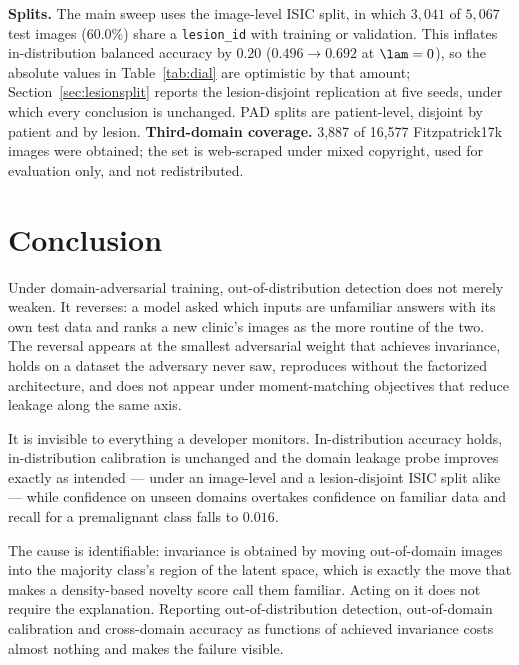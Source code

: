 \textbf{Splits.} The main sweep uses the image-level ISIC split, in which
$3{,}041$ of $5{,}067$ test images ($60.0\%$) share a \texttt{lesion\_id} with
training or validation. This inflates in-distribution balanced accuracy by
$0.20$ ($0.496 \to 0.692$ at $\lam = 0$), so the absolute values in
Table~\ref{tab:dial} are optimistic by that amount;
Section~\ref{sec:lesionsplit} reports the lesion-disjoint replication at five
seeds, under which every conclusion is unchanged. PAD splits are patient-level,
disjoint by patient and by lesion. \textbf{Third-domain coverage.} 3{,}887 of 16{,}577 Fitzpatrick17k images were
obtained; the set is web-scraped under mixed copyright, used for evaluation only,
and not redistributed.

\section{Conclusion}

Under domain-adversarial training, out-of-distribution detection does not merely
weaken. It reverses: a model asked which inputs are unfamiliar answers with its
own test data and ranks a new clinic's images as the more routine of the two.
The reversal appears at the smallest adversarial weight that achieves
invariance, holds on a dataset the adversary never saw, reproduces without the
factorized architecture, and does not appear under moment-matching objectives
that reduce leakage along the same axis.

It is invisible to everything a developer monitors. In-distribution accuracy
holds, in-distribution calibration is unchanged and the domain leakage probe
improves exactly as intended --- under an image-level and a lesion-disjoint ISIC
split alike --- while confidence on unseen domains overtakes confidence on
familiar data and recall for a premalignant class falls to $0.016$.

The cause is identifiable: invariance is obtained by moving out-of-domain
images into the majority class's region of the latent space, which is exactly
the move that makes a density-based novelty score call them familiar. Acting on
it does not require the explanation. Reporting out-of-distribution detection,
out-of-domain calibration and cross-domain accuracy as functions of achieved
invariance costs almost nothing and makes the failure visible.

